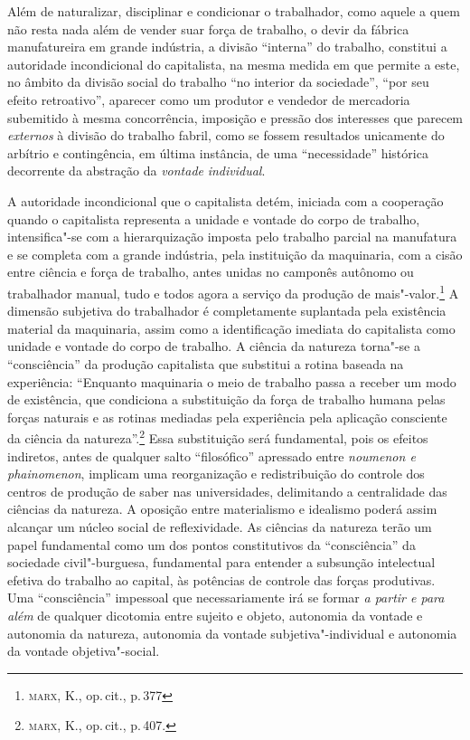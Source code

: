 Além de naturalizar, disciplinar e condicionar o trabalhador, como
aquele a quem não resta nada além de vender suar força de trabalho, o
devir da fábrica manufatureira em grande indústria, a divisão
``interna'' do trabalho, constitui a autoridade incondicional do
capitalista, na mesma medida em que permite a este, no âmbito da divisão
social do trabalho ``no interior da sociedade'', ``por seu efeito
retroativo'', aparecer como um produtor e vendedor de mercadoria
subemitido à mesma concorrência, imposição e pressão dos interesses que %
parecem \emph{externos} à divisão do trabalho fabril, como se fossem
resultados unicamente do arbítrio e contingência, em última instância,
de uma ``necessidade'' histórica decorrente da abstração da
\emph{vontade} \emph{individual}.

A autoridade incondicional que o capitalista detém, iniciada com a
cooperação quando o capitalista representa a unidade e vontade do corpo
de trabalho, intensifica"-se com a hierarquização imposta pelo trabalho
parcial na manufatura e se completa com a grande indústria, pela
instituição da maquinaria, com a cisão entre ciência e força de
trabalho, antes unidas no camponês autônomo ou trabalhador manual, tudo
e todos agora a serviço da produção de mais"-valor.\footnote{\textsc{marx}, K., op.\,cit., p.\,377} A dimensão subjetiva do trabalhador é completamente suplantada
pela existência material da maquinaria, assim como a identificação
imediata do capitalista como unidade e vontade do corpo de trabalho. A
ciência da natureza torna"-se a ``consciência'' da produção capitalista
que substitui a rotina baseada na experiência: ``Enquanto maquinaria o
meio de trabalho passa a receber um modo de existência, que condiciona a
substituição da força de trabalho humana pelas forças naturais e as
rotinas mediadas pela experiência pela aplicação consciente da ciência
da natureza''.\footnote{\textsc{marx}, K., op.\,cit., p.\,407.} Essa substituição será fundamental, pois os efeitos
indiretos, antes de qualquer salto ``filosófico'' apressado entre
\emph{noumenon e phainomenon}, implicam uma reorganização e
redistribuição do controle dos centros de produção de saber nas
universidades, delimitando a centralidade das ciências da natureza. A
oposição entre materialismo e idealismo poderá assim alcançar um núcleo
social de reflexividade. As ciências da natureza terão um papel
fundamental como um dos pontos constitutivos da ``consciência'' da
sociedade civil"-burguesa, fundamental para entender a subsunção
intelectual efetiva do trabalho ao capital, às potências de controle das
forças produtivas. Uma ``consciência'' impessoal que necessariamente irá
se formar \emph{a partir e para além} de qualquer dicotomia entre
sujeito e objeto, autonomia da vontade e autonomia da natureza,
autonomia da vontade subjetiva"-individual e autonomia da vontade
objetiva"-social.

